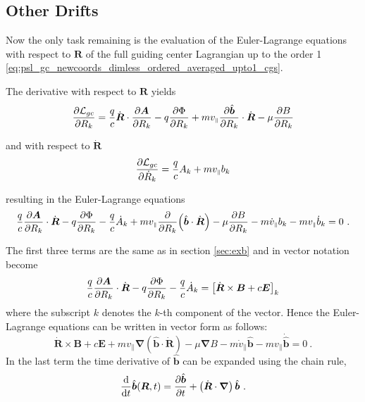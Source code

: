 \documentclass{scrartcl}
\renewcommand{\vec}[1]{\boldsymbol{#1}}
\newcommand{\uv}[1]{\hat{\vec{#1}}}
\newcommand{\bnabla}{\vec{\nabla}}
\newcommand{\rvgc}{\vec{R}} %
\newcommand{\PSL}{\mathcal{L}}
\newcommand{\subparallel}{{\scriptscriptstyle\parallel}}
\begin{document}
\subsection{Other Drifts}
Now the only task remaining is the evaluation of the Euler-Lagrange equations with respect to $\rvgc$ of the full guiding center Lagrangian up to the order 1 \eqref{eq:psl_gc_newcoords_dimless_ordered_averaged_upto1_cgs}.

The derivative with respect to $\rvgc$ yields
\begin{equation*}
    \pdv{\PSL_{gc}}{R_k} = \frac{q}{c}\dot{\rvgc}\cdot\pdv{\vec{A}}{R_k} - q\pdv{\Phi}{R_k} + mv_\subparallel\pdv{\uv{b}}{R_k}\cdot\dot{\rvgc} - \mu\pdv{B}{R_k}
\end{equation*}

and with respect to $\dot{\rvgc}$
\begin{equation*}
    \pdv{\PSL_{gc}}{\dot{R}_k} = \frac{q}{c}A_k + mv_\subparallel b_k
\end{equation*}

resulting in the Euler-Lagrange equations
\begin{equation*}
    \frac{q}{c}\pdv{\vec{A}}{R_k}\cdot\dot{\rvgc} - q\pdv{\Phi}{R_k} - \frac{q}{c}\dot{A}_k + mv_\subparallel\pdv{R_k}(\uv{b}\cdot\dot{\rvgc}) - \mu\pdv{B}{R_k} - m\dot{v}_\subparallel b_k - mv_\subparallel \dot{b}_k = 0 \ .
\end{equation*}

The first three terms are the same as in section \ref{sec:exb} and in vector notation become
\begin{equation*}
     \frac{q}{c}\pdv{\vec{A}}{R_k}\cdot\dot{\rvgc} - q\pdv{\Phi}{R_k} - \frac{q}{c}\dot{A}_k = \left[\dot{\rvgc}\times\vec{B} + c\vec{E}\right]_k
\end{equation*}
where the subscript $k$ denotes the $k$-th component of the vector. Hence the Euler-Lagrange equations can be written in vector form as follows:
\begin{equation*}
    \dot{\rvgc}\times\vec{B} + c\vec{E} + mv_\subparallel\bnabla(\uv{b}\cdot\dot{\rvgc}) - \mu\bnabla B - m\dot{v}_\subparallel\uv{b} - mv_\subparallel\dot{\uv{b}} = 0 \ .
\end{equation*}
In the last term the time derivative of $\uv{b}$ can be expanded using the chain rule,
\begin{equation*}
    \dv{t}\uv{b}(\rvgc,t) = \pdv{\uv{b}}{t} + \left(\dot{\rvgc}\cdot\bnabla\right)\uv{b} \ .
\end{equation*}
\end{document}
